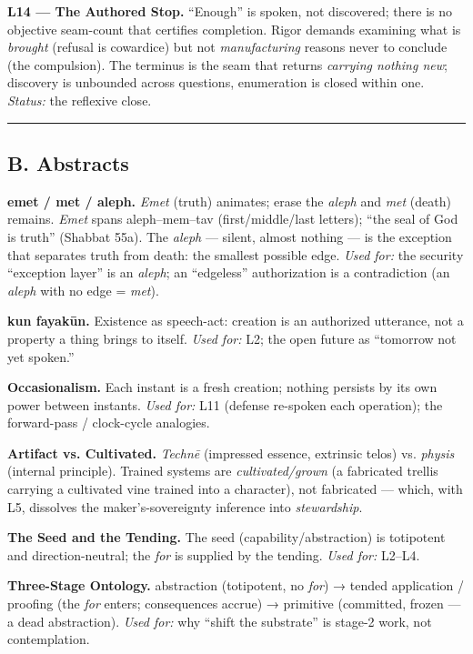 \documentclass[11pt]{article}
\begin{document}
\textbf{L14 — The Authored Stop.} ``Enough'' is spoken, not discovered; there is no objective seam-count that certifies completion. Rigor demands examining what is \emph{brought} (refusal is cowardice) but not \emph{manufacturing} reasons never to conclude (the compulsion). The terminus is the seam that returns \emph{carrying nothing new}; discovery is unbounded across questions, enumeration is closed within one. \emph{Status:} the reflexive close.

\medskip\noindent\rule{\linewidth}{0.3pt}\medskip

\subsection*{B. Abstracts}

\textbf{emet /\allowbreak{} met /\allowbreak{} aleph.} \emph{Emet} (truth) animates; erase the \emph{aleph} and \emph{met} (death) remains. \emph{Emet} spans aleph–mem–tav (first/\allowbreak{}middle/\allowbreak{}last letters); ``the seal of God is truth'' (Shabbat 55a). The \emph{aleph} — silent, almost nothing — is the exception that separates truth from death: the smallest possible edge. \emph{Used for:} the security ``exception layer'' is an \emph{aleph}; an ``edgeless'' authorization is a contradiction (an \emph{aleph} with no edge = \emph{met}).

\textbf{kun fayakūn.} Existence as speech-act: creation is an authorized utterance, not a property a thing brings to itself. \emph{Used for:} L2; the open future as ``tomorrow not yet spoken.''

\textbf{Occasionalism.} Each instant is a fresh creation; nothing persists by its own power between instants. \emph{Used for:} L11 (defense re-spoken each operation); the forward-pass /\allowbreak{} clock-cycle analogies.

\textbf{Artifact vs. Cultivated.} \emph{Technē} (impressed essence, extrinsic telos) vs. \emph{physis} (internal principle). Trained systems are \emph{cultivated/\allowbreak{}grown} (a fabricated trellis carrying a cultivated vine trained into a character), not fabricated — which, with L5, dissolves the maker's-sovereignty inference into \emph{stewardship}.

\textbf{The Seed and the Tending.} The seed (capability/\allowbreak{}abstraction) is totipotent and direction-neutral; the \emph{for} is supplied by the tending. \emph{Used for:} L2–L4.

\textbf{Three-Stage Ontology.} abstraction (totipotent, no \emph{for}) → tended application /\allowbreak{} proofing (the \emph{for} enters; consequences accrue) → primitive (committed, frozen — a dead abstraction). \emph{Used for:} why ``shift the substrate'' is stage-2 work, not contemplation.
\end{document}
